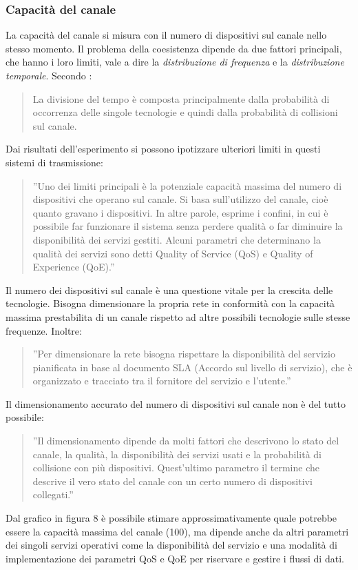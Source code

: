 \documentclass[a4paper]{report} %
\begin{document}
\subsubsection{Capacità del canale} 
La capacità del canale si misura con il numero di dispositivi sul canale nello stesso momento. Il problema della coesistenza dipende da due fattori principali, che hanno i loro limiti, vale a dire la \textit{distribuzione di frequenza} e la \textit{distribuzione temporale}. Secondo \cite{art:rif.46}:
\begin{quote}
	La divisione del tempo è composta principalmente dalla probabilità di occorrenza delle singole tecnologie e quindi dalla probabilità di collisioni sul canale.
\end{quote}
Dai risultati dell'esperimento \cite{art:rif.46} si possono ipotizzare ulteriori limiti in questi sistemi di trasmissione:
\begin{quote}
	''Uno dei limiti principali è la potenziale capacità massima del numero di dispositivi che operano sul canale. Si basa sull'utilizzo del canale, cioè quanto gravano i dispositivi. In altre parole, esprime i confini, in cui è possibile far funzionare il sistema senza perdere qualità o far diminuire la disponibilità dei servizi gestiti. Alcuni parametri che determinano la qualità dei servizi sono detti Quality of Service (QoS) e Quality of Experience (QoE).''
\end{quote}
Il numero dei dispositivi sul canale è una questione vitale per la crescita delle tecnologie. Bisogna dimensionare la propria rete in conformità con la capacità massima prestabilita di un canale rispetto ad altre possibili tecnologie sulle stesse frequenze. Inoltre:
\begin{quote}
	''Per dimensionare la rete bisogna rispettare la disponibilità del servizio pianificata in base al documento SLA (Accordo sul livello di servizio), che è organizzato e tracciato tra il fornitore del servizio e l'utente.''
\end{quote}
Il dimensionamento accurato del numero di dispositivi sul canale non è del tutto possibile:
\begin{quote}
	''Il dimensionamento dipende da molti fattori che descrivono lo stato del canale, la qualità, la disponibilità dei servizi usati e la probabilità di collisione con più dispositivi. Quest'ultimo parametro il termine che descrive il vero stato del canale con un certo numero di dispositivi collegati.''
\end{quote}
Dal grafico in figura 8 è possibile stimare approssimativamente quale potrebbe essere la capacità massima del canale (100), ma dipende anche da altri parametri dei singoli servizi operativi come la disponibilità del servizio e una modalità di implementazione dei parametri QoS e QoE per riservare e gestire i flussi di dati. 
\end{document}
